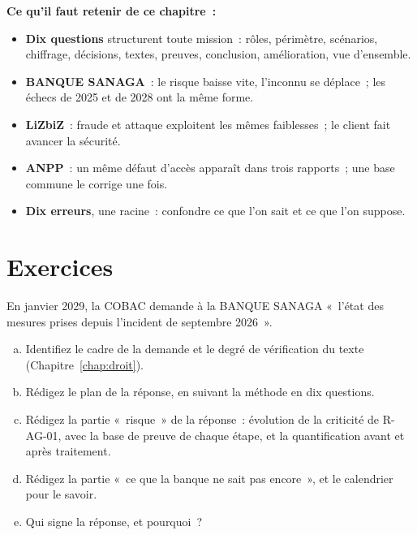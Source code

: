 \begin{boxresume}
\textbf{Ce qu'il faut retenir de ce chapitre~:}
\begin{itemize}
    \item \textbf{Dix questions} structurent toute mission~: rôles,
          périmètre, scénarios, chiffrage, décisions, textes, preuves,
          conclusion, amélioration, vue d'ensemble.
    \item \textbf{BANQUE SANAGA}~: le risque baisse vite, l'inconnu se
          déplace~; les échecs de 2025 et de 2028 ont la même forme.
    \item \textbf{LiZbiZ}~: fraude et attaque exploitent les mêmes
          faiblesses~; le client fait avancer la sécurité.
    \item \textbf{ANPP}~: un même défaut d'accès apparaît dans trois
          rapports~; une base commune le corrige une fois.
    \item \textbf{Dix erreurs}, une racine~: confondre ce que l'on sait et
          ce que l'on suppose.
\end{itemize}
\end{boxresume}

\section*{Exercices}

\begin{boxexo}[title={\ding{45}\quad Étude de cas~14.1. La réponse à la COBAC \niveauexpert}]
En janvier 2029, la COBAC demande à la BANQUE SANAGA «~l'état des mesures
prises depuis l'incident de septembre 2026~».
\begin{enumerate}[(a)]
    \item Identifiez le cadre de la demande et le degré de vérification du
          texte (Chapitre~\ref{chap:droit}).
    \item Rédigez le plan de la réponse, en suivant la méthode en dix
          questions.
    \item Rédigez la partie «~risque~» de la réponse~: évolution de la
          criticité de R-AG-01, avec la base de preuve de chaque étape, et
          la quantification avant et après traitement.
    \item Rédigez la partie «~ce que la banque ne sait pas encore~», et le
          calendrier pour le savoir.
    \item Qui signe la réponse, et pourquoi~?
\end{enumerate}
\end{boxexo}

